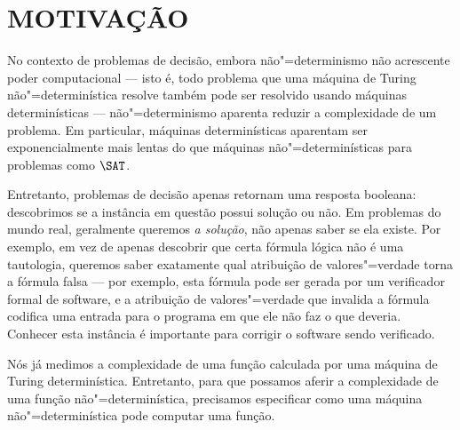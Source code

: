 \section{MOTIVAÇÃO}

No contexto de problemas de decisão,
embora não"=determinismo não acrescente poder computacional
--- isto é,
todo problema que uma máquina de Turing não"=determinística resolve
também pode ser resolvido usando máquinas determinísticas
---
não"=determinismo aparenta reduzir a complexidade de um problema.
Em particular,
máquinas determinísticas aparentam ser exponencialmente mais lentas
do que máquinas não"=determinísticas
para problemas como $\SAT$.

Entretanto,
problemas de decisão apenas retornam uma resposta booleana:
descobrimos se a instância em questão possui solução ou não.
Em problemas do mundo real,
geralmente queremos \emph{a solução},
não apenas saber se ela existe.
Por exemplo,
em vez de apenas descobrir que certa fórmula lógica não é uma tautologia,
queremos saber exatamente qual atribuição de valores"=verdade
torna a fórmula falsa
--- por exemplo,
esta fórmula pode ser gerada por um verificador formal de software,
e a atribuição de valores"=verdade que invalida a fórmula
codifica uma entrada para o programa
em que ele não faz o que deveria.
Conhecer esta instância é importante para corrigir o software sendo verificado.

Nós já medimos a complexidade de uma função
calculada por uma máquina de Turing determinística.
Entretanto,
para que possamos aferir a complexidade de uma função não"=determinística,
precisamos especificar como uma máquina não"=determinística pode computar uma função.
